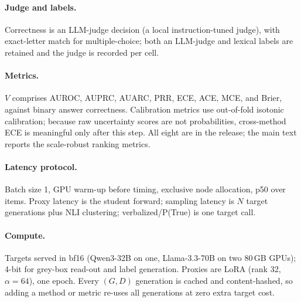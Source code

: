 \documentclass[11pt]{article}
\begin{document}
\paragraph{Judge and labels.} Correctness is an LLM-judge decision (a local
instruction-tuned judge), with exact-letter match for multiple-choice; both an LLM-judge
and lexical labels are retained and the judge is recorded per cell.
\paragraph{Metrics.} $V$ comprises AUROC, AUPRC, AUARC, PRR, ECE, ACE, MCE, and Brier,
against binary answer correctness. Calibration metrics use out-of-fold isotonic
calibration; because raw uncertainty scores are not probabilities, cross-method ECE is
meaningful only after this step. All eight are in the release; the main text reports the
scale-robust ranking metrics.
\paragraph{Latency protocol.} Batch size 1, GPU warm-up before timing, exclusive node
allocation, p50 over items. Proxy latency is the student forward; sampling latency is $N$
target generations plus NLI clustering; verbalized/P(True) is one target call.
\paragraph{Compute.} Targets served in bf16 (Qwen3-32B on one, Llama-3.3-70B on two 80\,GB
GPUs); 4-bit for grey-box read-out and label generation. Proxies are LoRA
(rank 32, $\alpha{=}64$), one epoch. Every $(G,D)$ generation is cached and content-hashed,
so adding a method or metric re-uses all generations at zero extra target cost.
\end{document}
